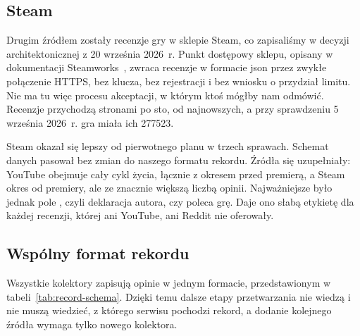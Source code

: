 \subsection{Steam}
\label{sec:req-steam}

Drugim źródłem zostały recenzje gry w sklepie Steam, co zapisaliśmy w decyzji architektonicznej z 20 września 2026~r.
Punkt dostępowy sklepu, opisany w dokumentacji Steamworks~\cite{docsteamreviews}, zwraca recenzje w formacie \ac{json} przez zwykłe połączenie HTTPS, bez klucza, bez rejestracji i bez wniosku o przydział limitu.
Nie ma tu więc procesu akceptacji, w którym ktoś mógłby nam odmówić.
Recenzje przychodzą stronami po sto, od najnowszych, a przy sprawdzeniu 5 września 2026~r. gra miała ich \num{277523}.

Steam okazał się lepszy od pierwotnego planu w trzech sprawach.
Schemat danych pasował bez zmian do naszego formatu rekordu.
Źródła się uzupełniały: YouTube obejmuje cały cykl życia, łącznie z okresem przed premierą, a Steam okres od premiery, ale ze znacznie większą liczbą opinii.
Najważniejsze było jednak pole , czyli deklaracja autora, czy poleca grę.
Daje ono słabą etykietę dla każdej recenzji, której ani YouTube, ani Reddit nie oferowały.

\subsection{Wspólny format rekordu}
\label{sec:req-record}

Wszystkie kolektory zapisują opinie w jednym formacie, przedstawionym w tabeli~\ref{tab:record-schema}.
Dzięki temu dalsze etapy przetwarzania nie wiedzą i nie muszą wiedzieć, z którego serwisu pochodzi rekord, a dodanie kolejnego źródła wymaga tylko nowego kolektora.

